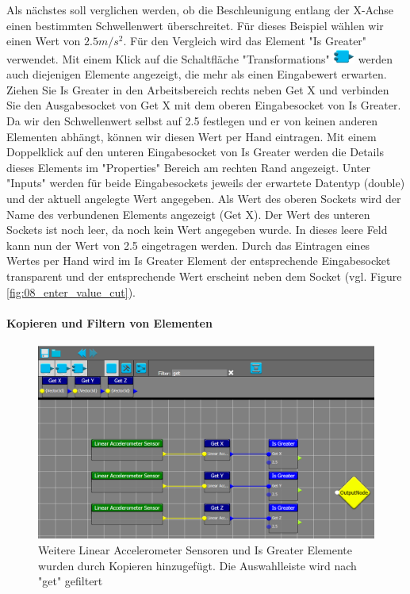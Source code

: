 Als n\"achstes soll verglichen werden, ob die Beschleunigung entlang der X-Achse einen bestimmten Schwellenwert \"uberschreitet. F\"ur dieses Beispiel w\"ahlen wir einen Wert von $2.5m/s^2$. F\"ur den Vergleich wird das Element "Is Greater" verwendet. Mit einem Klick auf die Schaltfl\"ache "Transformations" \includegraphics[width = 20pt]{Manual/transformations} werden auch diejenigen Elemente angezeigt, die mehr als einen Eingabewert erwarten. Ziehen Sie Is Greater in den Arbeitsbereich rechts neben Get X und verbinden Sie den Ausgabesocket von Get X mit dem oberen Eingabesocket von Is Greater. Da wir den Schwellenwert selbst auf 2.5 festlegen und er von keinen anderen Elementen abh\"angt, k\"onnen wir diesen Wert per Hand eintragen. Mit einem Doppelklick auf den unteren Eingabesocket von Is Greater werden die Details dieses Elements im "Properties" Bereich am rechten Rand angezeigt. Unter "Inputs" werden f\"ur beide Eingabesockets jeweils der erwartete Datentyp (double) und der aktuell angelegte Wert angegeben. Als Wert des oberen Sockets wird der Name des verbundenen Elements angezeigt (Get X). Der Wert des unteren Sockets ist noch leer, da noch kein Wert angegeben wurde. In dieses leere Feld kann nun der Wert von 2.5 eingetragen werden. Durch das Eintragen eines Wertes per Hand wird im Is Greater Element der entsprechende Eingabesocket transparent und der entsprechende Wert erscheint neben dem Socket (vgl. Figure \ref{fig:08_enter_value_cut}).

\paragraph{Kopieren und Filtern von Elementen}

\begin{figure}[h!]
	\centering
		\includegraphics[width = \textwidth]{Manual/09_filter}
	\caption{Weitere Linear Accelerometer Sensoren und Is Greater Elemente wurden durch Kopieren hinzugef\"ugt. Die Auswahlleiste wird nach "get" gefiltert}
	\label{fig:09_filter}
\end{figure}

